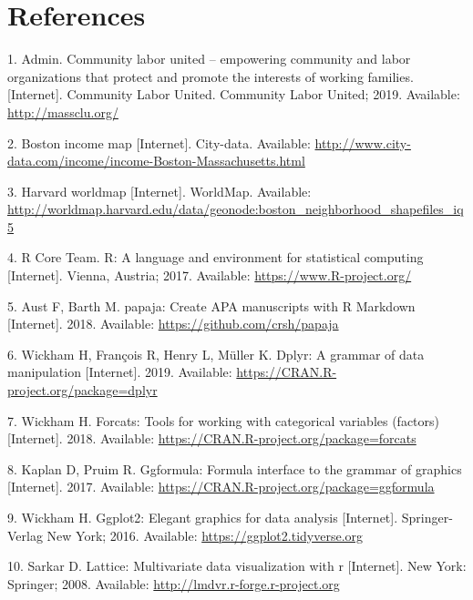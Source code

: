 \documentclass[10pt,letterpaper]{article}
\begin{document}
\section*{References}\label{references.unumbered}

\hypertarget{refs}{}
\hypertarget{ref-CLU}{}
1. Admin. Community labor united -- empowering community and labor
organizations that protect and promote the interests of working
families. {[}Internet{]}. Community Labor United. Community Labor
United; 2019. Available: \url{http://massclu.org/}

\hypertarget{ref-bostonmap}{}
2. Boston income map {[}Internet{]}. City-data. Available:
\url{http://www.city-data.com/income/income-Boston-Massachusetts.html}

\hypertarget{ref-bostonshapefile}{}
3. Harvard worldmap {[}Internet{]}. WorldMap. Available:
\url{http://worldmap.harvard.edu/data/geonode:boston_neighborhood_shapefiles_iq5}

\hypertarget{ref-R-base}{}
4. R Core Team. R: A language and environment for statistical computing
{[}Internet{]}. Vienna, Austria; 2017. Available:
\url{https://www.R-project.org/}

\hypertarget{ref-R-papaja}{}
5. Aust F, Barth M. papaja: Create APA manuscripts with R Markdown
{[}Internet{]}. 2018. Available: \url{https://github.com/crsh/papaja}

\hypertarget{ref-R-dplyr}{}
6. Wickham H, François R, Henry L, Müller K. Dplyr: A grammar of data
manipulation {[}Internet{]}. 2019. Available:
\url{https://CRAN.R-project.org/package=dplyr}

\hypertarget{ref-R-forcats}{}
7. Wickham H. Forcats: Tools for working with categorical variables
(factors) {[}Internet{]}. 2018. Available:
\url{https://CRAN.R-project.org/package=forcats}

\hypertarget{ref-R-ggformula}{}
8. Kaplan D, Pruim R. Ggformula: Formula interface to the grammar of
graphics {[}Internet{]}. 2017. Available:
\url{https://CRAN.R-project.org/package=ggformula}

\hypertarget{ref-R-ggplot2}{}
9. Wickham H. Ggplot2: Elegant graphics for data analysis
{[}Internet{]}. Springer-Verlag New York; 2016. Available:
\url{https://ggplot2.tidyverse.org}

\hypertarget{ref-R-lattice}{}
10. Sarkar D. Lattice: Multivariate data visualization with r
{[}Internet{]}. New York: Springer; 2008. Available:
\url{http://lmdvr.r-forge.r-project.org}
\end{document}
